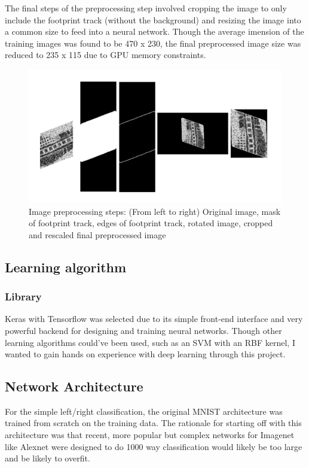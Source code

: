 \documentclass{article}
\begin{document}
The final steps of the preprocessing step involved cropping the image to only include the footprint track (without the background) and resizing the image into a common size to feed into a neural network. Though the average imension of the training images was found to be 470 x 230, the final preprocessed image size was reduced to 235 x 115 due to GPU memory constraints.

\begin{figure}[h]
  \includegraphics[width=\linewidth]{preprocessing_1.png}
  \caption{Image preprocessing steps: (From left to right) Original image, mask of footprint track, edges of footprint track, rotated image, cropped and rescaled final preprocessed image}
  \label{fig:preprocessing_1}
\end{figure}

\subsection{Learning algorithm}

\subsubsection{Library}
Keras with Tensorflow was selected due to its simple front-end interface and very powerful backend for designing and training neural networks. Though other learning algorithms could've been used, such as an SVM with an RBF kernel, I wanted to gain hands on experience with deep learning through this project.

\subsection{Network Architecture}
For the simple left/right classification, the original MNIST architecture was trained from scratch on the training data. The rationale for starting off with this architecture was that recent, more popular but complex networks for Imagenet like Alexnet were designed to do 1000 way classification would likely be too large and be likely to overfit. 
\end{document}
